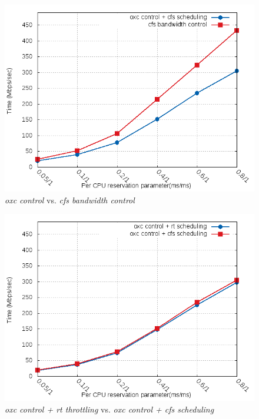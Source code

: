 \begin{figure}[htbp]
        \centering
        \includegraphics[width=\textwidth, totalheight=0.4\textheight]{images/expB2}
        \caption{\emph{oxc control} vs. \emph{cfs bandwidth control}}
        \label{fig:expB2}
\end{figure}
\begin{figure}[htbp]
        \centering
        \includegraphics[width=\textwidth, totalheight=0.4\textheight]{images/expB3}
        \caption{\emph{oxc control + rt throttling} vs. \emph{oxc control + cfs scheduling}}
        \label{fig:expB3}
\end{figure}


